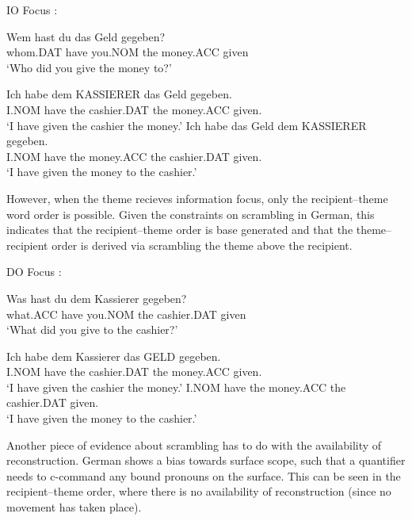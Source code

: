 \documentclass[11pt]{upenndiss}
\begin{document}
\begin{exe}
\ex IO Focus \citep{Choi.1996}:
\begin{xlist}
\ex \gll Wem hast du das Geld gegeben?\\
whom.DAT have you.NOM the money.ACC given\\
\trans `Who did you give the money to?'
\begin{xlist}
\ex \gll Ich habe dem KASSIERER das Geld gegeben.\\
I.NOM have the cashier.DAT the money.ACC given.\\
\trans `I have given the cashier the money.'
\ex \gll Ich habe das Geld dem KASSIERER gegeben.\\
I.NOM have the money.ACC the cashier.DAT given.\\
\trans `I have given the money to the cashier.'
\end{xlist}
\end{xlist}
\end{exe}

However, when the theme recieves information focus, only the recipient--theme word order is possible. Given the constraints on scrambling in German, this indicates that the recipient--theme order is base generated and that the theme--recipient order is derived via scrambling the theme above the recipient.

\begin{exe}
	\ex DO Focus \citep{Choi.1996}:
\begin{xlist}
\ex \gll Was hast du dem Kassierer gegeben?\\
what.ACC have you.NOM the cashier.DAT given\\
\trans `What did you give to the cashier?'
\begin{xlist}
\ex \gll Ich habe dem Kassierer das GELD gegeben.\\
I.NOM have the cashier.DAT the money.ACC given.\\
\trans `I have given the cashier the money.'
I.NOM have the money.ACC the cashier.DAT given.\\
\trans `I have given the money to the cashier.'
\end{xlist}
\end{xlist}
\end{exe}

Another piece of evidence about scrambling has to do with the availability of reconstruction. German shows a bias towards surface scope, such that a quantifier needs to c-command any bound pronouns on the surface. This can be seen in the recipient--theme order, where there is no availability of reconstruction (since no movement has taken place).
\end{document}
